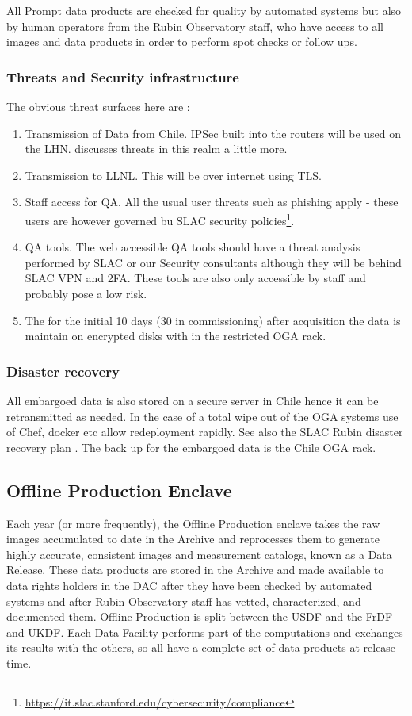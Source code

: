 All Prompt data products are checked for quality by automated systems but also by human operators from the Rubin Observatory staff, who have access to all images and data products in order to perform spot checks or follow ups.

\subsubsection{ Threats and Security infrastructure}
The obvious threat surfaces here are :
\begin{enumerate}
\item Transmission of Data from Chile. IPSec built into the routers will be used on the \gls{LHN}.  discusses threats in this realm a little more.
\item Transmission to \gls{LLNL}.  This will be over internet using TLS.
\item Staff access for \gls{QA}. All the usual user threats such as phishing apply - these users are however governed bu SLAC security policies\footnote{\url{https://it.slac.stanford.edu/cybersecurity/compliance}}.
\item QA tools. The web accessible QA tools should have a threat analysis performed by SLAC or our Security consultants although they will be behind SLAC \gls{VPN} and 2FA. These tools are also only accessible by staff and probably pose a low risk.
\item The for the initial 10 days (30 in commissioning) after acquisition the data is maintain on encrypted disks with in the restricted \gls{OGA} rack.
\end{enumerate}

\subsubsection{Disaster recovery}
All embargoed data is also stored on a secure server in Chile hence it can be retransmitted as needed.
In the case of a total wipe out of the \gls{OGA} systems use of Chef, docker etc allow redeployment rapidly.
See also the \gls{SLAC} Rubin disaster recovery plan .
The back up for the embargoed data is the Chile OGA rack.

\subsection{ Offline Production  \gls{Enclave}}
Each year (or more frequently), the Offline Production enclave takes the raw images accumulated to date in the Archive and reprocesses them to generate highly accurate, consistent images and measurement catalogs, known as a Data Release. These data products are stored in the Archive and made available to data rights holders in the DAC after they have been checked by automated systems and after Rubin Observatory staff has vetted, characterized, and documented them. Offline Production is split between the USDF and the \gls{FrDF} and UKDF. Each Data Facility performs part of the computations and exchanges its results with the others, so all have a complete set of data products at release time.


